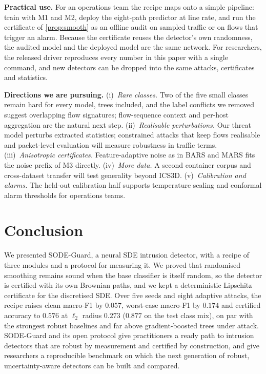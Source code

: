 \documentclass{article}
\theoremstyle{definition}
\begin{document}
\textbf{Practical use.} For an operations team the recipe maps onto a simple
pipeline: train with M1 and M2, deploy the eight-path predictor at line rate,
and run the certificate of \cref{prop:smooth} as an offline audit on sampled
traffic or on flows that trigger an alarm. Because the certificate reuses the
detector's own randomness, the audited model and the deployed model are the
same network. For researchers, the released driver reproduces every number in
this paper with a single command, and new detectors can be dropped into the
same attacks, certificates and statistics.

\textbf{Directions we are pursuing.}
(i)~\emph{Rare classes.} Two of the five small classes remain hard for every
model, trees included, and the label conflicts we removed suggest overlapping
flow signatures; flow-sequence context and per-host aggregation are the natural
next step.
(ii)~\emph{Realisable perturbations.} Our threat model perturbs extracted
statistics; constrained attacks that keep flows realisable
\citep{simonetto2024tabularbench} and packet-level evaluation will measure
robustness in traffic terms.
(iii)~\emph{Anisotropic certificates.} Feature-adaptive noise as in BARS and MARS
\citep{wang2023bars,huang2025mars} fits the noise prefix of M3 directly.
(iv)~\emph{More data.} A second container corpus and cross-dataset transfer
will test generality beyond ICS3D.
(v)~\emph{Calibration and alarms.} The held-out calibration half supports
temperature scaling and conformal alarm thresholds for operations teams.

\section{Conclusion}\label{sec:conc}
We presented SODE-Guard, a neural SDE intrusion detector, with a recipe of
three modules and a protocol for measuring it. We proved that randomised
smoothing remains sound when the base classifier is itself random, so the
detector is certified with its own Brownian paths, and we kept a deterministic
Lipschitz certificate for the discretised SDE. Over five seeds and eight
adaptive attacks, the recipe raises clean macro-F1 by $0.057$, worst-case
macro-F1 by $0.174$ and certified accuracy to $0.576$ at $\ell_2$ radius $0.273$
($0.877$ on the test class mix), on par with the strongest robust baselines and
far above gradient-boosted trees under attack. SODE-Guard and its open protocol
give practitioners a ready path to intrusion detectors that are robust by
measurement and certified by construction, and give researchers a reproducible
benchmark on which the next generation of robust, uncertainty-aware detectors
can be built and compared.
\end{document}
